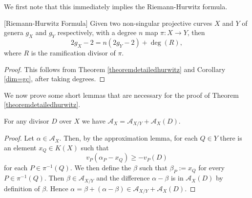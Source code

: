 We first note that this immediately implies the Riemann-Hurwitz formula.

    \begin{cor}\label{hur}[Riemann-Hurwitz Formula]
    Given two non-singular projective curves $X$ and $Y$ of genera $g_X$ and $g_Y$ respectively, with a degree $n$ map $\pi\colon X \rightarrow Y$, then
        \[
        2g_X - 2 = n(2g_Y -2) + \deg(R),
        \]
    where $R$ is the ramification divisor of $\pi$.
    \end{cor}
    \begin{proof}
    This follows from Theorem \ref{theoremdetailedhurwitz} and Corollary \ref{dim=gc}, after taking degrees.
    \end{proof}


We now prove some short lemmas that are necessary for the proof of Theorem \ref{theoremdetailedhurwitz}.


    \begin{lem}\label{lemmaadelespace}
    For any divisor $D$ over $X$ we have $\mathcal {A}_X = \mathcal{A}_{X/Y} + \mathcal{A}_X(D)$.
    \end{lem}
    \begin{proof}
    Let $\alpha \in \mathcal{A}_X$. Then, by the approximation lemma, for each $Q\in Y$ there is an element $x_Q\in K(X)$ such that 
        \[
        v_P(\alpha_P - x_Q) \geq -v_P(D)
        \]
    for each $P\in \pi^{-1}(Q)$. 
    We then define the \adele $\beta$ such that $\beta_P := x_Q$ for every $P\in \pi^{-1}(Q)$.
    Then $\beta \in \mathcal{A}_{X/Y}$ and the difference $\alpha - \beta$ is in $\mathcal{A}_X(D)$ by definition of $\beta$.
    Hence $\alpha = \beta + (\alpha - \beta) \in \mathcal{A}_{X/Y} + \mathcal{A}_X(D)$.
    \end{proof}

